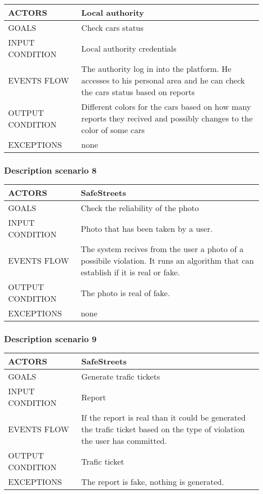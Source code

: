 \begin{center}
	\begin{tabular}{ | l | p{6cm} | } 
		\hline
		ACTORS & Local authority  \\ 
		\hline
		GOALS & Check cars status  \\ 
		\hline
		INPUT CONDITION & Local authority credentials  \\ 
		\hline
		EVENTS FLOW & The authority log in into the platform. He accesses to his personal area and he can check the cars status based on reports \\ 
		\hline
		OUTPUT CONDITION & Different colors for the cars based on how many reports they recived and possibly changes to the color of some cars \\ 
		\hline
		EXCEPTIONS & none \\ 
		\hline
	\end{tabular}
\end{center}

\subsubsection{Description scenario 8}

\begin{center}
	\begin{tabular}{ | l | p{6cm} | } 
		\hline
		ACTORS & SafeStreets  \\ 
		\hline
		GOALS & Check the reliability of the photo  \\ 
		\hline
		INPUT CONDITION & Photo that has been taken by a user.  \\ 
		\hline
		EVENTS FLOW & The system recives from the user a photo of a possibile violation. It runs an algorithm that can establish if it is real or fake. \\ 
		\hline
		OUTPUT CONDITION & The photo is real of fake. \\ 
		\hline
		EXCEPTIONS & none \\ 
		\hline
	\end{tabular}
\end{center}

\subsubsection{Description scenario 9}

\begin{center}
	\begin{tabular}{ | l | p{6cm} | } 
		\hline
		ACTORS & SafeStreets  \\ 
		\hline
		GOALS & Generate trafic tickets  \\ 
		\hline
		INPUT CONDITION & Report  \\ 
		\hline
		EVENTS FLOW & If the report is real than it could be generated the trafic ticket based on the type of violation the user has committed. \\ 
		\hline
		OUTPUT CONDITION & Trafic ticket \\ 
		\hline
		EXCEPTIONS & The report is fake, nothing is generated. \\ 
		\hline
	\end{tabular}
\end{center}

